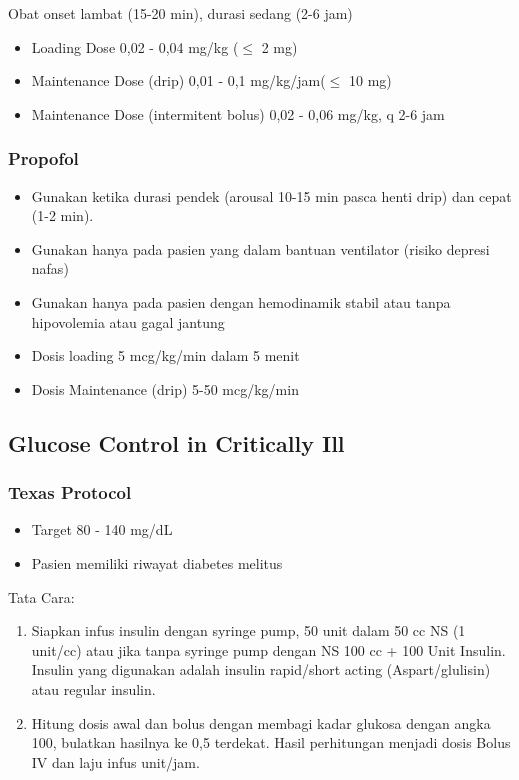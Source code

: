 \documentclass[
]{book}
\providecommand{\tightlist}{%
  \setlength{\itemsep}{0pt}\setlength{\parskip}{0pt}}
\begin{document}
Obat onset lambat (15-20 min), durasi sedang (2-6 jam)

\begin{itemize}
\item
  Loading Dose
  0,02 - 0,04 mg/kg (\(\leq\) 2 mg)
\item
  Maintenance Dose (drip)
  0,01 - 0,1 mg/kg/jam(\(\leq\) 10 mg)
\item
  Maintenance Dose (intermitent bolus)
  0,02 - 0,06 mg/kg, q 2-6 jam
\end{itemize}

\hypertarget{propofol}{%
\subsubsection{Propofol}\label{propofol}}

\begin{itemize}
\item
  Gunakan ketika durasi pendek (arousal 10-15 min pasca henti drip) dan cepat (1-2 min).
\item
  Gunakan hanya pada pasien yang dalam bantuan ventilator (risiko depresi nafas)
\item
  Gunakan hanya pada pasien dengan hemodinamik stabil atau tanpa hipovolemia atau gagal jantung
\item
  Dosis loading
  5 mcg/kg/min dalam 5 menit
\item
  Dosis Maintenance (drip)
  5-50 mcg/kg/min
\end{itemize}

\hypertarget{glucose-control-in-critically-ill}{%
\subsection{Glucose Control in Critically Ill}\label{glucose-control-in-critically-ill}}

\hypertarget{texas-protocol}{%
\subsubsection{Texas Protocol}\label{texas-protocol}}

\begin{itemize}
\tightlist
\item
  Target 80 - 140 mg/dL
\item
  Pasien memiliki riwayat diabetes melitus
\end{itemize}

Tata Cara:

\begin{enumerate}
\def\labelenumi{\arabic{enumi}.}
\item
  Siapkan infus insulin dengan syringe pump, 50 unit dalam 50 cc NS (1 unit/cc) atau jika tanpa syringe pump dengan NS 100 cc + 100 Unit Insulin. Insulin yang digunakan adalah insulin rapid/short acting (Aspart/glulisin) atau regular insulin.
\item
  Hitung dosis awal dan bolus dengan membagi kadar glukosa dengan angka 100, bulatkan hasilnya ke 0,5 terdekat. Hasil perhitungan menjadi dosis Bolus IV dan laju infus unit/jam.
\end{enumerate}
\end{document}
